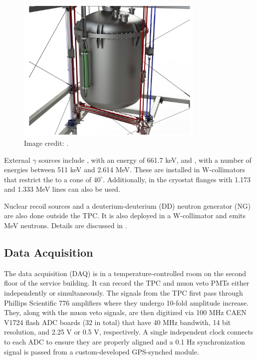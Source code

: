 \begin{figure}
\centering
\includegraphics[width=0.8\textwidth]{TPCCalibrations}
\caption{Image credit: .}
\label{fig:xenon1t_calibrations_belts}
\end{figure}

External $\gamma$ sources include , with an energy of 661.7 keV, and , with a number of energies between 511 keV
and 2.614 MeV.  These are installed in W-collimators that restrict the \gammarays to a cone of $40^{\circ}$.  Additionally, 
in the cryostat flanges with 1.173 and 1.333 MeV lines can also be used.

Nuclear recoil sources \ambe and a deuterium-deuterium (DD) neutron generator (NG) are also done outside the TPC.  It is also deployed in a
W-collimator and emits MeV neutrons.  Details are discussed in .



\subsection{Data Acquisition}
\label{subsec:xenon1t_daq}
The data acquisition (DAQ) is in a temperature-controlled room on the second floor of the service building.  It can record the TPC and
muon veto PMTs either independently or simultaneously.  The signals from the TPC first pass through Phillips Scientific 776 amplifiers
where they undergo 10-fold amplitude increase.  They, along with the muon veto signals, are then digitized via 100 MHz CAEN V1724 flash
ADC boards (32 in total) that have 40 MHz bandwith, 14 bit resolution, and 2.25 V or 0.5 V, respectively.  A single independent clock
connects to each ADC to ensure they are properly aligned and a 0.1 Hz synchronization signal is passed from a custom-developed GPS-synched
module.

